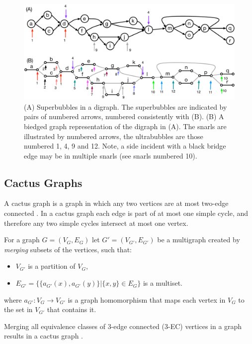 \documentclass[11pt]{ucthesis}
\begin{document}
\begin{figure}
\centering
\includegraphics[width=1.0\textwidth]{snarlfigures/fig2.pdf}
\caption{\label{fig:super_bubbles_and_complex_bubbles} (A) Superbubbles in a digraph. The superbubbles are indicated by pairs of numbered arrows, numbered consistently with (B). (B) 
A biedged graph representation of the digraph in (A). The snarls are illustrated by numbered arrows, the ultrabubbles are those numbered 1, 4, 9 and 12. Note, a side incident with a black bridge edge may be in multiple snarls (see snarls numbered 10).}
\end{figure}


\subsection{Cactus Graphs}

A cactus graph is a graph in which any two vertices are at most two-edge connected \cite{Harary:1953vba}. In a cactus graph each edge is part of at most one simple cycle, and therefore any two simple cycles intersect at most one vertex. 

For a graph $G = (V_G, E_G)$ let $G' = (V_{G'}, E_{G'})$ be a multigraph created by \emph{merging} subsets of the vertices, such that:
\begin{itemize}
\item$V_{G'}$ is a partition of $V_{G}$,
\item $E_{G'} = \{ \{ a_{G'}(x), a_{G'}(y) \} | \{x, y\} \in E_G \}$ is a multiset.
\end{itemize}
where $a_{G'} : V_G \rightarrow V_{G'}$ is a graph homomorphism that maps each vertex in $V_{G}$ to the set in $V_{G'}$ that contains it. 

Merging all equivalence classes of 3-edge connected (3-EC) vertices in a graph results in a cactus graph \cite{Paten:2011fv}. 
\end{document}
